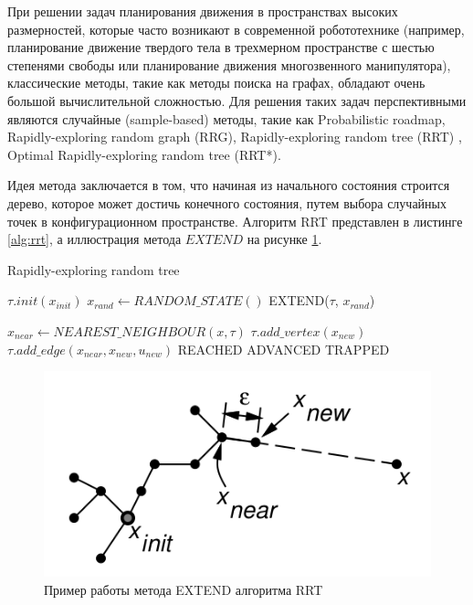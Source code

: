 При решении задач планирования движения в пространствах высоких размерностей, которые часто возникают в современной
робототехнике (например, планирование движение твердого тела в трехмерном пространстве с шестью степенями свободы или
планирование движения многозвенного манипулятора), классические методы, такие как методы поиска на графах, обладают
очень большой вычислительной сложностью. Для решения таких задач перспективными являются случайные (sample-based) методы,
такие как Probabilistic roadmap, Rapidly-exploring random graph (RRG), Rapidly-exploring random tree (RRT)
\cite{motion_planning_rrt}, Optimal Rapidly-exploring random tree (RRT*)\cite{motion_planning_rrt_star}.

Идея метода заключается в том, что начиная из начального состояния строится дерево, которое может достичь конечного
состояния, путем выбора случайных точек в конфигурационном пространстве. Алгоритм RRT представлен в листинге
\ref{alg:rrt}, а иллюстрация метода $EXTEND$ на рисунке \ref{img:rrt_extend}.

\begin{algorithm}
    \caption{ Rapidly-exploring random tree }
    \label{alg:rrt}
    \begin{algorithmic}

            $\tau.init(x_{init})$
                \State $x_{rand} \leftarrow RANDOM\_STATE()$
                \State EXTEND($\tau$, $x_{rand}$)
            \EndFor
        \EndFunction

            $x_{near} \leftarrow NEAREST\_NEIGHBOUR(x, \tau)$
                \State $\tau.add\_vertex(x_{new})$
                \State $\tau.add\_edge(x_{near}, x_{new}, u_{new})$
                    \State \Return REACHED
                \Else
                    \State \Return ADVANCED
                \EndIf
            \EndIf
            \Return TRAPPED
        \EndFunction
    \end{algorithmic}
\end{algorithm}

\begin{figure}[h]
    \centering
    \includegraphics[]{images/rrt_extend}
    \caption{Пример работы метода EXTEND алгоритма RRT}
    \label{img:rrt_extend}
\end{figure}

